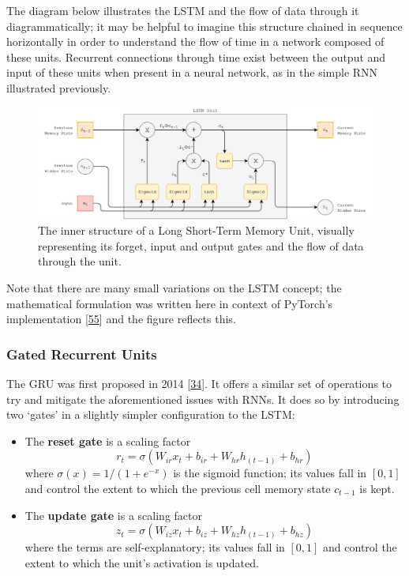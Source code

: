 \documentclass[12pt,]{article}
\providecommand{\tightlist}{%
  \setlength{\itemsep}{0pt}\setlength{\parskip}{0pt}}
\begin{document}
The diagram below illustrates the LSTM and the flow of data through it
diagrammatically; it may be helpful to imagine this structure chained in
sequence horizontally in order to understand the flow of time in a
network composed of these units. Recurrent connections through time
exist between the output and input of these units when present in a
neural network, as in the simple RNN illustrated previously.

\begin{figure}
\centering
\includegraphics{Images/lstm.png}
\caption{The inner structure of a Long Short-Term Memory Unit, visually
representing its forget, input and output gates and the flow of data
through the unit.}
\end{figure}

Note that there are many small variations on the LSTM concept; the
mathematical formulation was written here in context of PyTorch's
implementation {[}\protect\hyperlink{ref-pytorchlstm}{55}{]} and the
figure reflects this.

\hypertarget{gated-recurrent-units}{%
\subsubsection{Gated Recurrent Units}\label{gated-recurrent-units}}

The GRU was first proposed in 2014
{[}\protect\hyperlink{ref-cho2014learning}{34}{]}. It offers a similar
set of operations to try and mitigate the aforementioned issues with
RNNs. It does so by introducing two `gates' in a slightly simpler
configuration to the LSTM:

\begin{itemize}
\tightlist
\item
  The \textbf{reset gate} is a scaling factor
  \[r_t = \sigma(W_{ir} x_t + b_{ir} + W_{hr} h_{(t-1)} + b_{hr})\]
  where \(\sigma(x) = 1 / (1 + e^{-x})\) is the sigmoid function; its
  values fall in \([0,1]\) and control the extent to which the previous
  cell memory state \(c_{t-1}\) is kept.
\item
  The \textbf{update gate} is a scaling factor
  \[z_t = \sigma(W_{iz} x_t + b_{iz} + W_{hz} h_{(t-1)} + b_{hz})\]
  where the terms are self-explanatory; its values fall in \([0,1]\) and
  control the extent to which the unit's activation is updated.
\end{itemize}
\end{document}
